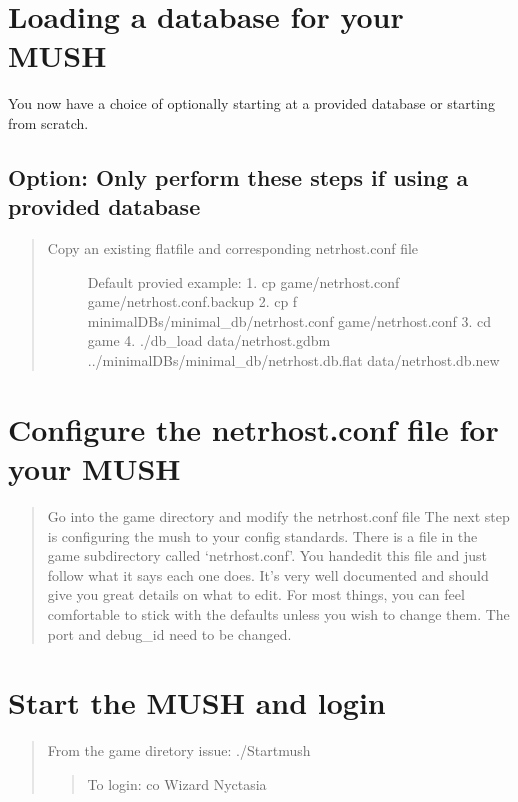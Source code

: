 \documentclass[letterpaper,10pt,english]{sphinxmanual}
\begin{document}
\section{Loading a database for your MUSH}
\label{\detokenize{24-quickinstall:loading-a-database-for-your-mush}}
\sphinxAtStartPar
You now have a choice of optionally starting at a provided database or starting from scratch.


\subsection{Option: Only perform these steps if using a provided database}
\label{\detokenize{24-quickinstall:option-only-perform-these-steps-if-using-a-provided-database}}\begin{quote}
\begin{description}
\item[{Copy an existing flatfile and corresponding netrhost.conf file}] \leavevmode
\sphinxAtStartPar
Default provied example:
1.  cp game/netrhost.conf game/netrhost.conf.backup
2.  cp \sphinxhyphen{}f minimal\sphinxhyphen{}DBs/minimal\_db/netrhost.conf game/netrhost.conf
3.  cd game
4.  ./db\_load data/netrhost.gdbm ../minimal\sphinxhyphen{}DBs/minimal\_db/netrhost.db.flat data/netrhost.db.new

\end{description}
\end{quote}


\section{Configure the netrhost.conf file for your MUSH}
\label{\detokenize{24-quickinstall:configure-the-netrhost-conf-file-for-your-mush}}\begin{quote}

\sphinxAtStartPar
Go into the game directory and modify the netrhost.conf file
The next step is configuring the mush to your config standards.
There is a file in the game subdirectory called ‘netrhost.conf’.
You hand\sphinxhyphen{}edit this file and just follow what it says each
one does.  It’s very well documented and should give you
great details on what to edit.  For most things, you can
feel comfortable to stick with the defaults unless you wish
to change them.  The port and debug\_id need to be changed.
\end{quote}


\section{Start the MUSH and login}
\label{\detokenize{24-quickinstall:start-the-mush-and-login}}\begin{quote}

\sphinxAtStartPar
From the game diretory issue: ./Startmush
\begin{quote}

\sphinxAtStartPar
To login:  co Wizard Nyctasia
\end{quote}
\end{quote}
\end{document}
